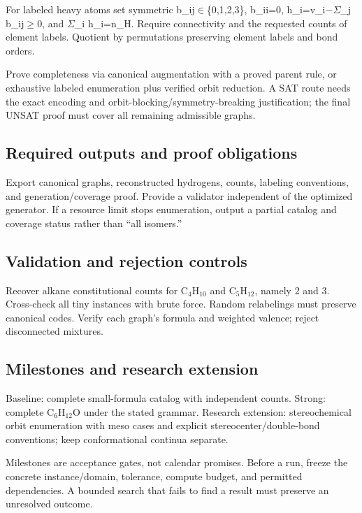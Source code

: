\documentclass[
  11pt,
]{article}
\begin{document}
For labeled heavy atoms set symmetric b\_ij\ensuremath{\in}\{0,1,2,3\},
b\_ii=0, h\_i=v\_i\ensuremath{-}\ensuremath{\Sigma}\_j
b\_ij\ensuremath{\ge}0, and \ensuremath{\Sigma}\_i h\_i=n\_H. Require
connectivity and the requested counts of element labels. Quotient by
permutations preserving element labels and bond orders.

Prove completeness via canonical augmentation with a proved parent rule,
or exhaustive labeled enumeration plus verified orbit reduction. A SAT
route needs the exact encoding and orbit-blocking/symmetry-breaking
justification; the final UNSAT proof must cover all remaining admissible
graphs.

\subsection{Required outputs and proof obligations}

Export canonical graphs, reconstructed hydrogens, counts, labeling
conventions, and generation/coverage proof. Provide a validator
independent of the optimized generator. If a resource limit stops
enumeration, output a partial catalog and coverage status rather than
``all isomers.''

\subsection{Validation and rejection controls}

Recover alkane constitutional counts for
C\ensuremath{{}_{4}}H\ensuremath{{}_{10}} and
C\ensuremath{{}_{5}}H\ensuremath{{}_{12}}, namely 2 and 3. Cross-check
all tiny instances with brute force. Random relabelings must preserve
canonical codes. Verify each graph's formula and weighted valence;
reject disconnected mixtures.

\subsection{Milestones and research extension}

Baseline: complete small-formula catalog with independent counts.
Strong: complete C\ensuremath{{}_{6}}H\ensuremath{{}_{12}}O under the
stated grammar. Research extension: stereochemical orbit enumeration
with meso cases and explicit stereocenter/double-bond conventions; keep
conformational continua separate.

Milestones are acceptance gates, not calendar promises. Before a run,
freeze the concrete instance/domain, tolerance, compute budget, and
permitted dependencies. A bounded search that fails to find a result
must preserve an unresolved outcome.
\end{document}
